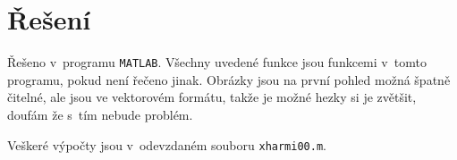 \documentclass[a4paper, 11pt, twocolumn]{article}
\begin{document}


	\section*{Řešení}

	Řešeno v~programu \texttt{MATLAB}. Všechny uvedené funkce jsou funkcemi v~tomto programu,
	pokud není řečeno jinak. Obrázky jsou na první pohled možná špatně čitelné, ale jsou ve
	vektorovém formátu, takže je možné hezky si je zvětšit, doufám že s~tím nebude problém.

	Veškeré výpočty jsou v~odevzdaném souboru \texttt{xharmi00.m}.
\end{document}
